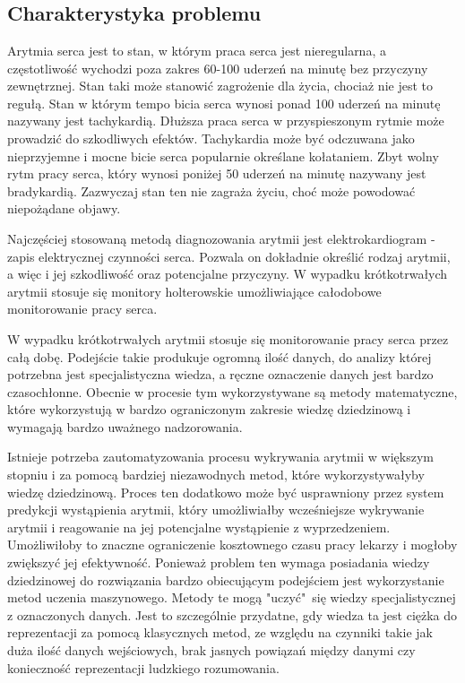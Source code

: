 \documentclass[polish,12pt]{aghthesis}
\author{Konrad Dobroś, Tomasz Nizio}
\date{\the\year}
\begin{document}
\maketitle

\tableofcontents
\newpage


\section{\SectionTitleProjectVision}
\label{sec:cel-wizja}
\subsection{Charakterystyka problemu}

Arytmia serca jest to stan, w którym praca serca jest nieregularna, a częstotliwość wychodzi poza zakres 60-100 uderzeń na minutę bez przyczyny zewnętrznej. Stan taki może stanowić zagrożenie dla życia, chociaż nie jest to regułą. 
Stan w którym tempo bicia serca wynosi ponad 100 uderzeń na minutę nazywany jest tachykardią. Dłuższa praca serca w przyspieszonym rytmie może prowadzić do szkodliwych efektów. Tachykardia może być odczuwana jako nieprzyjemne i mocne bicie serca popularnie określane kołataniem.
Zbyt wolny rytm pracy serca, który wynosi poniżej 50 uderzeń na minutę nazywany jest bradykardią. Zazwyczaj stan ten nie zagraża życiu, choć może powodować niepożądane objawy.

Najczęściej stosowaną metodą diagnozowania arytmii jest elektrokardiogram - zapis elektrycznej czynności serca. Pozwala on dokładnie określić rodzaj arytmii, a więc i jej szkodliwość oraz potencjalne przyczyny. W wypadku krótkotrwałych arytmii stosuje się monitory holterowskie umożliwiające całodobowe monitorowanie pracy serca.

W wypadku krótkotrwałych arytmii stosuje się monitorowanie pracy serca przez całą dobę. Podejście takie produkuje ogromną ilość danych, do analizy której potrzebna jest specjalistyczna wiedza, a ręczne oznaczenie danych jest bardzo czasochłonne. Obecnie w procesie tym wykorzystywane są metody matematyczne, które wykorzystują w bardzo ograniczonym zakresie wiedzę dziedzinową i wymagają bardzo uważnego nadzorowania.

Istnieje potrzeba zautomatyzowania procesu wykrywania arytmii w większym stopniu i za pomocą bardziej niezawodnych metod, które wykorzystywałyby wiedzę dziedzinową. Proces ten dodatkowo może być usprawniony przez system predykcji wystąpienia arytmii, który umożliwiałby wcześniejsze wykrywanie arytmii i reagowanie na jej potencjalne wystąpienie z wyprzedzeniem. Umożliwiłoby to znaczne ograniczenie kosztownego czasu pracy lekarzy i mogłoby zwiększyć jej efektywność. Ponieważ problem ten wymaga posiadania wiedzy dziedzinowej do rozwiązania bardzo obiecującym podejściem jest wykorzystanie metod uczenia maszynowego. Metody te mogą "uczyć"\ się wiedzy specjalistycznej z oznaczonych danych. Jest to szczególnie przydatne, gdy wiedza ta jest ciężka do reprezentacji za pomocą klasycznych metod, ze względu na czynniki takie jak duża ilość danych wejściowych, brak jasnych powiązań między danymi czy konieczność reprezentacji ludzkiego rozumowania.
\end{document}
